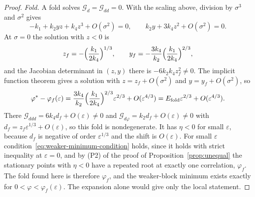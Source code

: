 \begin{proof}
\textit{Fold.} A fold solves $\mathcal G_d=\mathcal G_{dd}=0$. With the scaling above, division by $\sigma^3$ and $\sigma^2$ gives
\[
-k_1+k_2yz+k_4z^3+O(\sigma^2)=0,\qquad k_2y+3k_4z^2+O(\sigma^2)=0 .
\]
At $\sigma=0$ the solution with $z<0$ is
\[
z_f=-\Bigl(\frac{k_1}{2k_4}\Bigr)^{1/3},\qquad
y_f=-\frac{3k_4}{k_2}\Bigl(\frac{k_1}{2k_4}\Bigr)^{2/3},
\]
and the Jacobian determinant in $(z,y)$ there is $-6k_2k_4z_f^2\ne0$. The implicit function theorem gives a solution with $z=z_f+O(\sigma^2)$ and $y=y_f+O(\sigma^2)$, so
\[
\varphi^*-\varphi_f(\varepsilon)=\frac{3k_4}{k_2}\Bigl(\frac{k_1}{2k_4}\Bigr)^{2/3}\varepsilon^{2/3}+O(\varepsilon^{4/3})
=E_{\mathrm{fold}}\varepsilon^{2/3}+O(\varepsilon^{4/3}).
\]
There $\mathcal G_{ddd}=6k_4d_f+O(\varepsilon)\ne0$ and $\mathcal G_{d\varphi}=k_2d_f+O(\varepsilon)\ne0$ with $d_f=z_f\varepsilon^{1/3}+O(\varepsilon)$, so this fold is nondegenerate. It has $\eta<0$ for small $\varepsilon$, because $d_f$ is negative of order $\varepsilon^{1/3}$ and the shift is $O(\varepsilon)$. For small $\varepsilon$ condition~\eqref{eq:weaker-minimum-condition} holds, since it holds with strict inequality at $\varepsilon=0$, and by (P2) of the proof of Proposition~\ref{prop:unequal} the stationary points with $\eta<0$ have a repeated root at exactly one correlation, $\varphi_f$. The fold found here is therefore $\varphi_f$, and the weaker-block minimum exists exactly for $0<\varphi<\varphi_f(\varepsilon)$. The expansion alone would give only the local statement.


\end{proof}
